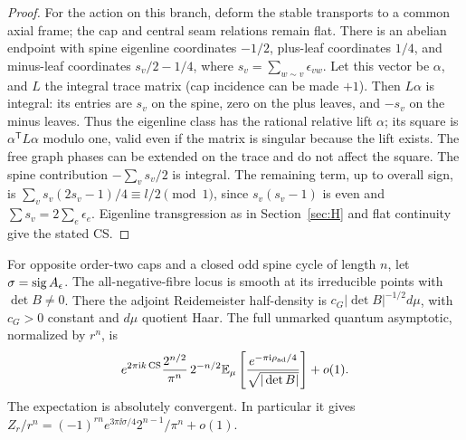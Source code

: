 \begin{proof}
For the action on this branch, deform the stable transports to a common axial frame; the cap and central seam relations remain flat. There is an abelian endpoint with spine eigenline coordinates \(-1/2\), plus-leaf coordinates \(1/4\), and minus-leaf coordinates \(s_v/2-1/4\), where \(s_v=\sum_{w\sim v}\epsilon_{vw}\). Let this vector be \(\alpha\), and \(L\) the integral trace matrix (cap incidence can be made \(+1\)). Then \(L\alpha\) is integral: its entries are \(s_v\) on the spine, zero on the plus leaves, and \(-s_v\) on the minus leaves. Thus the eigenline class has the rational relative lift \(\alpha\); its square is \(\alpha^{\mathsf T}L\alpha\) modulo one, valid even if the matrix is singular because the lift exists. The free graph phases can be extended on the trace and do not affect the square. The spine contribution \(-\sum_v s_v/2\) is integral. The remaining term, up to overall sign, is \(\sum_v s_v(2s_v-1)/4\equiv l/2\pmod1\), since \(s_v(s_v-1)\) is even and \(\sum s_v=2\sum_e\epsilon_e\). Eigenline transgression as in Section~\ref{sec:H} and flat continuity give the stated CS.
\end{proof}

\begin{theorem}\label{thm:cycle}
For opposite order-two caps and a closed odd spine cycle of length \(n\), let \(\sigma=\operatorname{sig} A_\epsilon\). The all-negative-fibre locus is smooth at its irreducible points with \(\det B\ne0\). There the adjoint Reidemeister half-density is \(c_G|\det B|^{-1/2}d\mu\), with \(c_G>0\) constant and \(d\mu\) quotient Haar. The full unmarked quantum asymptotic, normalized by \(r^n\), is
\begin{equation}\label{eq:cycleaps}
 e^{2\pi\mathrm i k\operatorname{CS}}\frac{2^{n/2}}{\pi^n}\,2^{-n/2}
   \mathbb E_\mu\left[\frac{e^{-\pi\mathrm i\rho_{\rm ad}/4}}{\sqrt{|\det B|}}\right]+o(1).
\end{equation}
The expectation is absolutely convergent. In particular it gives \(Z_r/r^n=(-1)^{rn}e^{3\pi\ii\sigma/4}2^{n-1}/\pi^n+o(1)\).
\end{theorem}

